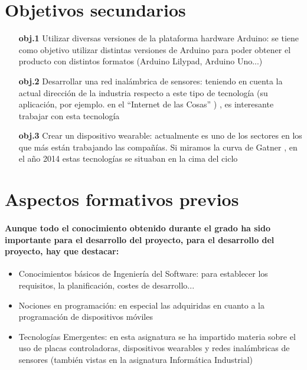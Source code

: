 \section{
Objetivos secundarios
}
  \begin{itemize}
    \item[\textbf{obj.1}]Utilizar diversas versiones de la plataforma hardware Arduino: se tiene como objetivo utilizar distintas versiones de Arduino para poder obtener el producto con distintos formatos (Arduino Lilypad, Arduino Uno...)
    \item[\textbf{obj.2}]Desarrollar una red inalámbrica de sensores: teniendo en cuenta la actual dirección de la industria respecto a este tipo de tecnología (su aplicación, por ejemplo. en el “Internet de las Cosas” \cite{hypeIoT} \cite{gatnercurve}) , es interesante trabajar con esta tecnología
    \item[\textbf{obj.3}]Crear un dispositivo wearable: actualmente es uno de los sectores en los que más están trabajando las compañías. Si miramos la curva de Gatner \cite{gatnercurve}, en el año 2014 estas tecnologías se situaban en la cima del ciclo
  \end{itemize}

\section{
Aspectos formativos previos
}
\paragraph{
Aunque todo el conocimiento obtenido durante el grado ha sido importante para el desarrollo del proyecto, para el desarrollo del proyecto, hay que destacar:
}
  \begin{itemize}
    \item Conocimientos básicos de Ingeniería del Software: para establecer los requisitos, la planificación, costes de desarrollo...
    \item Nociones en programación: en especial las adquiridas en cuanto a la programación de dispositivos móviles
    \item Tecnologías Emergentes: en esta asignatura se ha impartido materia sobre el uso de placas controladoras, dispositivos wearables y redes inalámbricas de sensores (también vistas en la asignatura Informática Industrial)
  \end{itemize}
